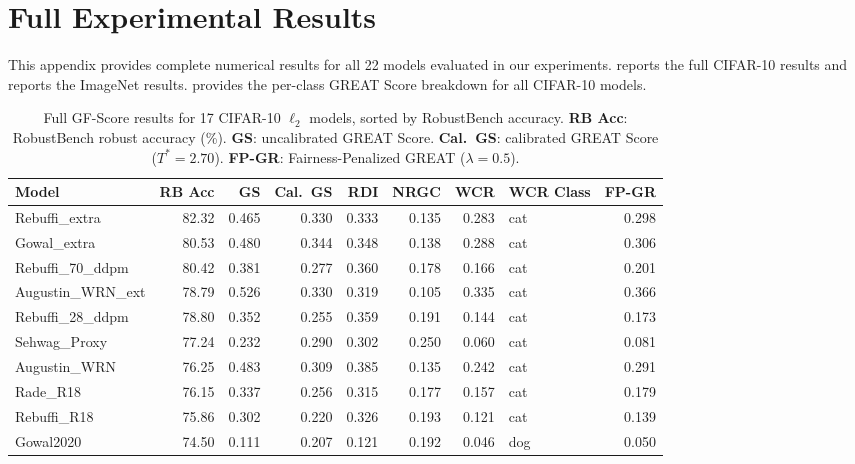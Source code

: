 \section{Full Experimental Results}
\label{app:full_results}

This appendix provides complete numerical results for all 22 models evaluated in our experiments.  reports the full CIFAR-10 results and  reports the ImageNet results.  provides the per-class GREAT Score breakdown for all CIFAR-10 models.

\begin{table}[H]
    \caption{Full GF-Score results for 17 CIFAR-10 $\ell_2$ models, sorted by RobustBench accuracy. \textbf{RB Acc}: RobustBench robust accuracy (\%). \textbf{GS}: uncalibrated GREAT Score. \textbf{Cal.\ GS}: calibrated GREAT Score ($T^* = 2.70$). \textbf{FP-GR}: Fairness-Penalized GREAT ($\lambda = 0.5$).}
    \label{tab:cifar_full}
    \centering
    \scriptsize
    \begin{tabular}{@{}lrrrrrrlr@{}}
        \toprule
        \textbf{Model} & \textbf{RB Acc} & \textbf{GS} & \textbf{Cal.\ GS} & \textbf{RDI} & \textbf{NRGC} & \textbf{WCR} & \textbf{WCR Class} & \textbf{FP-GR} \\
        \midrule
        Rebuffi\_extra     & 82.32 & 0.465 & 0.330 & 0.333 & 0.135 & 0.283 & cat & 0.298 \\
        Gowal\_extra       & 80.53 & 0.480 & 0.344 & 0.348 & 0.138 & 0.288 & cat & 0.306 \\
        Rebuffi\_70\_ddpm  & 80.42 & 0.381 & 0.277 & 0.360 & 0.178 & 0.166 & cat & 0.201 \\
        Augustin\_WRN\_ext & 78.79 & 0.526 & 0.330 & 0.319 & 0.105 & 0.335 & cat & 0.366 \\
        Rebuffi\_28\_ddpm  & 78.80 & 0.352 & 0.255 & 0.359 & 0.191 & 0.144 & cat & 0.173 \\
        Sehwag\_Proxy      & 77.24 & 0.232 & 0.290 & 0.302 & 0.250 & 0.060 & cat & 0.081 \\
        Augustin\_WRN      & 76.25 & 0.483 & 0.309 & 0.385 & 0.135 & 0.242 & cat & 0.291 \\
        Rade\_R18          & 76.15 & 0.337 & 0.256 & 0.315 & 0.177 & 0.157 & cat & 0.179 \\
        Rebuffi\_R18       & 75.86 & 0.302 & 0.220 & 0.326 & 0.193 & 0.121 & cat & 0.139 \\
        Gowal2020          & 74.50 & 0.111 & 0.207 & 0.121 & 0.192 & 0.046 & dog & 0.050 \\

\end{tabular}
\end{table}

